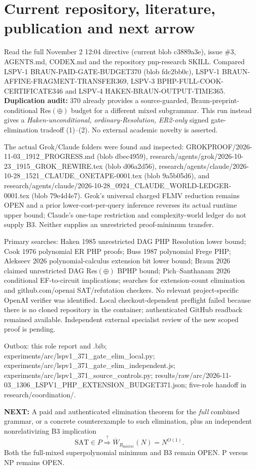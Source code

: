 \documentclass[11pt]{article}
\begin{document}
\section*{Current repository, literature, publication and next arrow}
Read the full November 2 12:04 directive (current blob c3889a3e), issue \#3, AGENTS.md, CODEX.md and the repository pnp-research SKILL. Compared LSPV-1 BRAUN-PAID-GATE-BUDGET370 (blob fdc2bb0c), LSPV-1 BRAUN-AFFINE-FRAGMENT-TRANSFER369, LSPV-3 BPHP-FULL-COOK-CERTIFICATE346 and LSPV-4 HAKEN-BRAUN-OUTPUT-TIME365. \textbf{Duplication audit:} 370 already provides a source-guarded, Braun-preprint-conditional Res$(\oplus)$ budget for a different mixed subgrammar. This run instead gives a \emph{Haken-unconditional, ordinary-Resolution, ER2-only} signed gate-elimination tradeoff (1)--(2). No external academic novelty is asserted.

The actual Grok/Claude folders were found and inspected: GROKPROOF/2026-11-03\_1912\_PROGRESS.md (blob dbec4959), research/agents/grok/2026-10-23\_1915\_GROK\_REWIRE.tex (blob d06a2d56), research/agents/claude/2026-10-28\_1521\_CLAUDE\_ONETAPE-0001.tex (blob 9a5b05d6), and research/agents/claude/2026-10-28\_0924\_CLAUDE\_WORLD-LEDGER-0001.tex (blob 79e4d4e7). Grok's universal charged FLMV reduction remains OPEN and a prior lower-cost-per-query inference reverses its actual runtime upper bound; Claude's one-tape restriction and complexity-world ledger do not supply B3. Neither supplies an unrestricted proof-minimum transfer.

Primary searches: Haken 1985 unrestricted DAG PHP Resolution lower bound; Cook 1976 polynomial ER PHP proofs; Buss 1987 polynomial Frege PHP; Alekseev 2026 polynomial-calculus extension bit lower bound; Braun 2026 claimed unrestricted DAG Res$(\oplus)$ BPHP bound; Pich--Santhanam 2026 conditional EF-to-circuit implications; searches for extension-count elimination and github.com/openai SAT/refutation checkers. No relevant project-specific OpenAI verifier was identified. Local checkout-dependent preflight failed because there is no cloned repository in the container; authenticated GitHub readback remained available. Independent external specialist review of the new scoped proof is pending.

Outbox: this role report and .bib; experiments/arc/lspv1\_371\_gate\_elim\_local.py; experiments/arc/lspv1\_371\_gate\_elim\_independent.js; experiments/arc/lspv1\_371\_source\_controls.py; results/raw/arc/2026-11-03\_1306\_LSPV1\_PHP\_EXTENSION\_BUDGET371.json; five-role handoff in research/coordination/.

\textbf{NEXT:} A paid and authenticated elimination theorem for the \emph{full} combined grammar, or a concrete counterexample to such elimination, plus an independent nonrelativizing B3 implication
\[
\mathrm{SAT}\in P\stackrel{?}{\Longrightarrow}
\overline W_{R_{\mathrm{mix341}}}(N)=N^{O(1)}.
\]
Both the full-mixed superpolynomial minimum and B3 remain OPEN. P versus NP remains OPEN.


\end{document}
